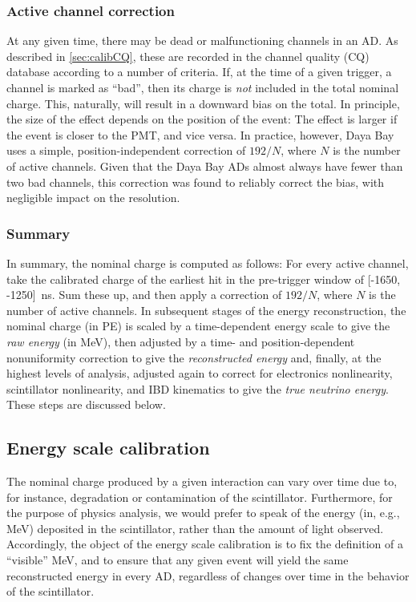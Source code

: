 \documentclass[../thesis.tex]{subfiles}
\begin{document}
\subsubsection{Active channel correction}
\label{sec:reconActiveChan}

At any given time, there may be dead or malfunctioning channels in an AD. As described in \autoref{sec:calibCQ}, these are recorded in the channel quality (CQ) database according to a number of criteria. If, at the time of a given trigger, a channel is marked as ``bad'', then its charge is \emph{not} included in the total nominal charge. This, naturally, will result in a downward bias on the total. In principle, the size of the effect depends on the position of the event: The effect is larger if the event is closer to the PMT, and vice versa. In practice, however, Daya Bay uses a simple, position-independent correction of $192/N$, where $N$ is the number of active channels. Given that the Daya Bay ADs almost always have fewer than two bad channels, this correction was found to reliably correct the bias, with negligible impact on the resolution.

\subsubsection{Summary}
\label{sec:reconChargeSummary}

In summary, the nominal charge is computed as follows: For every active channel, take the calibrated charge of the earliest hit in the pre-trigger window of [-1650, -1250]~ns. Sum these up, and then apply a correction of $192/N$, where $N$ is the number of active channels. In subsequent stages of the energy reconstruction, the nominal charge (in PE) is scaled by a time-dependent energy scale to give the \emph{raw energy} (in MeV), then adjusted by a time- and position-dependent nonuniformity correction to give the \emph{reconstructed energy} and, finally, at the highest levels of analysis, adjusted again to correct for electronics nonlinearity, scintillator nonlinearity, and IBD kinematics to give the \emph{true neutrino energy}. These steps are discussed below.

\subsection{Energy scale calibration}
\label{sec:reconEnergyScale}

The nominal charge produced by a given interaction can vary over time due to, for instance, degradation or contamination of the scintillator. Furthermore, for the purpose of physics analysis, we would prefer to speak of the energy (in, e.g., MeV) deposited in the scintillator, rather than the amount of light observed. Accordingly, the object of the energy scale calibration is to fix the definition of a ``visible'' MeV, and to ensure that any given event will yield the same reconstructed energy in every AD, regardless of changes over time in the behavior of the scintillator.
\end{document}
